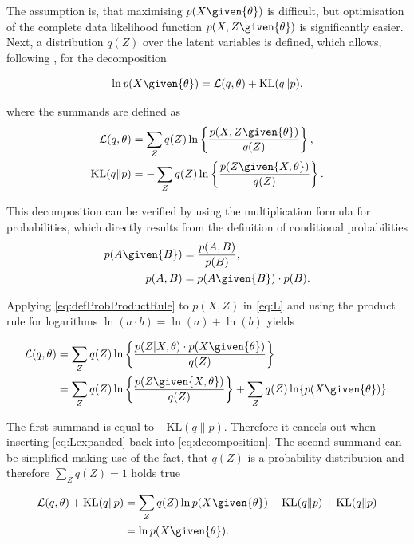 The assumption is, that maximising $p(X\given{\theta})$ is difficult, but optimisation of the complete data likelihood function $p(X,Z\given{\theta})$ is significantly easier. Next, a distribution $q(Z)$ over the latent variables is defined, which allows, following \cite[p.~450]{Bishop2006}, for the decomposition

\begin{equation}\label{eq:decomposition}
    \ln p(X\given{\theta})=\mathcal{L}(q,\theta)+\text{KL}(q\|p),
\end{equation}

where the summands are defined as
\begin{align}
    \mathcal{L}(q,\theta)&=\sum_Z q(Z)\ln\left\{\frac{p(X,Z\given{\theta})}{q(Z)}\right\}\label{eq:L},\\
    \text{KL}(q\|p)&=-\sum_{Z}q(Z)\ln\left\{\frac{p(Z\given{X,\theta})}{q(Z)} \right\}\label{eq:KL}.
\end{align}

This decomposition can be verified by using the multiplication formula for probabilities, which directly results from the definition of conditional probabilities
\begin{align}
\label{eq:defProbCond}
    p(A\given{B})&=\frac{p(A,B)}{p(B)},\\
\label{eq:defProbProductRule}
    p(A,B)&=p(A\given{B})\cdot p(B).
\end{align}

Applying \eqref{eq:defProbProductRule} to $p(X,Z)$ in \eqref{eq:L} and using the product rule for logarithms $\ln(a\cdot b)=\ln(a)+\ln(b)$ yields

\begin{align}
    \mathcal{L}(q,\theta)&=\sum_{Z}q(Z)\ln\left\{\frac{p(Z\vert X,\theta)\cdot p(X\given{\theta})}{q(Z)}\right\}\\
\label{eq:Lexpanded}
    &=\sum_{Z}q(Z)\ln\left\{\frac{p(Z\given{X,\theta})}{q(Z)} \right\}+\sum_{Z}q(Z)\ln\{p(X\given{\theta})\}.
\end{align}

The first summand is equal to $-\text{KL}(q\|p)$. Therefore it cancels out when inserting \eqref{eq:Lexpanded} back into \eqref{eq:decomposition}. The second summand can be simplified making use of the fact, that $q(Z)$ is a probability distribution and therefore $\sum_{Z}q(Z)=1$ holds true

\begin{align}
    \mathcal{L}(q,\theta)+\text{KL}(q\|p)&=\sum_{Z}q(Z)\ln p(X\given{\theta})-\text{KL}(q\|p)+\text{KL}(q\|p)\\
    &=\ln p(X\given{\theta}).
\end{align}

